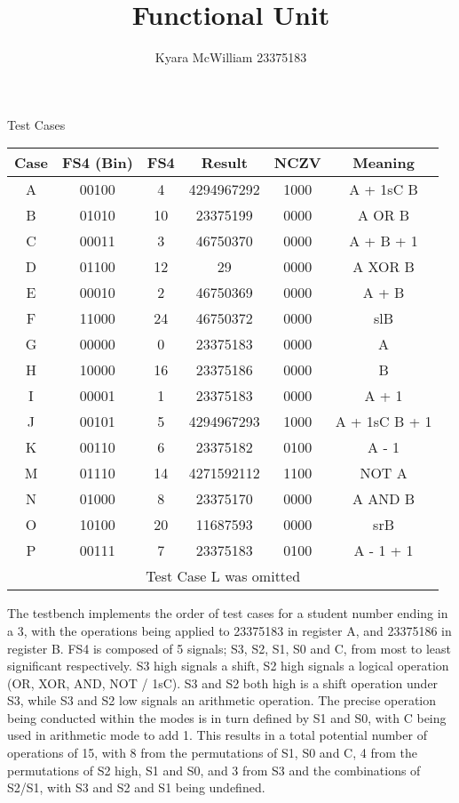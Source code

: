 \documentclass{article}
\title{Functional Unit}
\author{Kyara McWilliam 23375183}
\date{}
\begin{document}
\maketitle

Test Cases
\hfill \break

\begin{tabular}{ |c|c|c|c|c|c| }
\hline
Case & FS4 (Bin) & FS4 & Result & NCZV & Meaning \\
\hline
A & 00100 & 4 & 4294967292 & 1000 & A + 1sC B \\
B & 01010 & 10 & 23375199 & 0000 & A OR B \\
C & 00011 & 3 & 46750370 & 0000 & A + B + 1 \\
D & 01100 & 12 & 29 & 0000 & A XOR B \\
E & 00010 & 2 & 46750369 & 0000 & A + B \\
F & 11000 & 24 & 46750372 & 0000 & slB \\
G & 00000 & 0 & 23375183 & 0000 & A \\
H & 10000 & 16 & 23375186 & 0000 & B \\
I & 00001 & 1 & 23375183 & 0000 & A + 1 \\
J & 00101 & 5 & 4294967293 & 1000 & A + 1sC B + 1 \\
K & 00110 & 6 & 23375182 & 0100 & A - 1 \\
M & 01110 & 14 & 4271592112 & 1100 & NOT A \\
N & 01000 & 8 & 23375170 & 0000 & A AND B \\
O & 10100 & 20 & 11687593 & 0000 & srB \\
P & 00111 & 7 & 23375183 & 0100 & A - 1 + 1\\
\hline
\multicolumn{6}{|c|}{Test Case L was omitted}\\
\hline
\end{tabular}
\hfill \break \break
The testbench implements the order of test cases for a student number ending in a 3, with the operations being applied to 23375183 in register A, and 23375186 in register B.
\hfill \break \break
FS4 is composed of 5 signals; S3, S2, S1, S0 and C, from most to least significant respectively. S3 high signals a shift, S2 high signals a logical operation (OR, XOR, AND, NOT / 1sC). S3 and S2 both high is a shift operation under S3, while S3 and S2 low signals an arithmetic operation. The precise operation being conducted within the modes is in turn defined by S1 and S0, with C being used in arithmetic mode to add 1.
\hfill \break \break
This results in a total potential number of operations of 15, with 8 from the permutations of S1, S0 and C, 4 from the permutations of S2 high, S1 and S0, and 3 from S3 and the combinations of S2/S1, with S3 and S2 and S1 being undefined.
\end{document}
